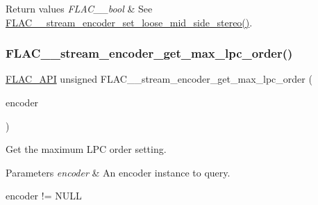 \begin{DoxyRetVals}{Return values}
{\em F\+L\+A\+C\+\_\+\+\_\+bool} & See \hyperlink{group__flac__stream__encoder_ga7b7d294dccd5df7c6c67e75f59798f48}{F\+L\+A\+C\+\_\+\+\_\+stream\+\_\+encoder\+\_\+set\+\_\+loose\+\_\+mid\+\_\+side\+\_\+stereo()}. \\
\hline
\end{DoxyRetVals}
\mbox{\label{group__flac__stream__encoder_ga283e0a80301d38295242f9b57ade15cf}} 
\subsubsection{\texorpdfstring{F\+L\+A\+C\+\_\+\+\_\+stream\+\_\+encoder\+\_\+get\+\_\+max\+\_\+lpc\+\_\+order()}{FLAC\_\_stream\_encoder\_get\_max\_lpc\_order()}}
{\footnotesize\ttfamily \hyperlink{group__flac__export_ga56ca07df8a23310707732b1c0007d6f5}{F\+L\+A\+C\+\_\+\+A\+PI} unsigned F\+L\+A\+C\+\_\+\+\_\+stream\+\_\+encoder\+\_\+get\+\_\+max\+\_\+lpc\+\_\+order (\begin{DoxyParamCaption}\item[{\hyperlink{zconf_8h_a2c212835823e3c54a8ab6d95c652660e}{const} \hyperlink{struct_f_l_a_c_____stream_encoder}{F\+L\+A\+C\+\_\+\+\_\+\+Stream\+Encoder} $\ast$}]{encoder }\end{DoxyParamCaption})}

Get the maximum L\+PC order setting.


\begin{DoxyParams}{Parameters}
{\em encoder} & An encoder instance to query.  
\begin{DoxyCode}
encoder != NULL 
\end{DoxyCode}
 \\
\hline
\end{DoxyParams}

